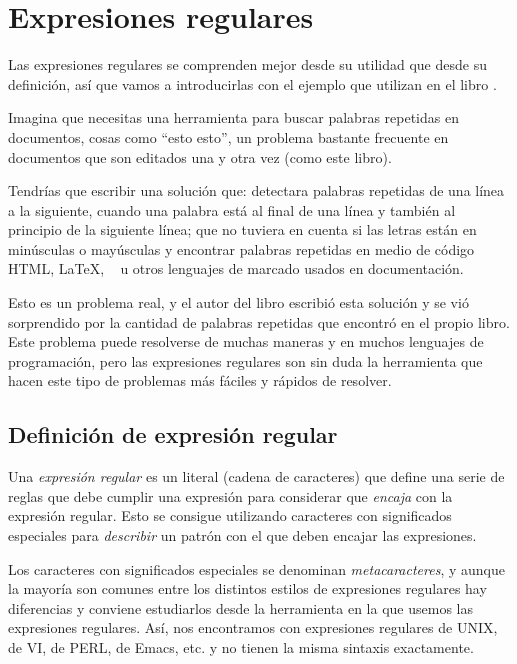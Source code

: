

\chapter{Expresiones regulares}
\label{regex.tex}

Las expresiones  regulares se comprenden  mejor desde su  utilidad que
desde su definición, así que vamos  a introducirlas con el ejemplo que
utilizan en el libro \cite{mastregex}.

Imagina que  necesitas una herramienta para  buscar palabras repetidas
en  documentos,  cosas  como   ``esto  esto'',  un  problema  bastante
frecuente en  documentos que son  editados una  y otra vez  (como este
libro). 

Tendrías que  escribir una solución que:  detectara palabras repetidas
de una línea a  la siguiente, cuando una palabra está  al final de una
línea y también al principio de  la siguiente línea; que no tuviera en
cuenta  si las  letras están  en minúsculas  o mayúsculas  y encontrar
palabras  repetidas en  medio de  código HTML,  \LaTeX, \LyX~  u otros
lenguajes de marcado usados en documentación.

Esto  es un  problema  real,  y el  autor  del libro  \cite{mastregex}
escribió  esta  solución y  se  vió  sorprendido  por la  cantidad  de
palabras  repetidas que  encontró en  el propio  libro. Este  problema
puede  resolverse  de   muchas  maneras  y  en   muchos  lenguajes  de
programación,  pero   las  expresiones  regulares  son   sin  duda  la
herramienta que hacen este tipo de  problemas más fáciles y rápidos de
resolver.

\section{Definición de expresión regular}

Una {\em expresión  regular} es un literal (cadena  de caracteres) que
define  una  serie de  reglas  que  debe  cumplir una  expresión  para
considerar que {\em encaja} con la expresión regular. Esto se consigue
utilizando caracteres con significados especiales para {\em describir}
un patrón con el que deben encajar las expresiones.

Los  caracteres   con  significados   especiales  se   denominan  {\em
metacaracteres}, y aunque  la mayoría son comunes  entre los distintos
estilos   de  expresiones   regulares  hay   diferencias  y   conviene
estudiarlos  desde la  herramienta en  la que  usemos las  expresiones
regulares. Así, nos encontramos con  expresiones regulares de UNIX, de
VI, de PERL, de Emacs, etc. y no tienen la misma sintaxis exactamente.

